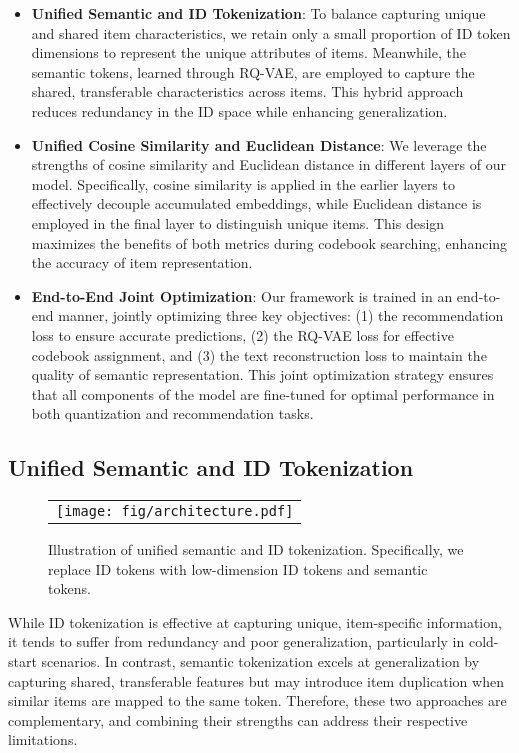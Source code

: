 \begin{itemize}[leftmargin=*]
    \item \textbf{Unified Semantic and ID Tokenization}: To balance capturing unique and shared item characteristics, we retain only a small proportion of ID token dimensions to represent the unique attributes of items. Meanwhile, the semantic tokens, learned through RQ-VAE, are employed to capture the shared, transferable characteristics across items. This hybrid approach reduces redundancy in the ID space while enhancing generalization.
    
    \item \textbf{Unified Cosine Similarity and Euclidean Distance}: We leverage the strengths of cosine similarity and Euclidean distance in different layers of our model. Specifically, cosine similarity is applied in the earlier layers to effectively decouple accumulated embeddings, while Euclidean distance is employed in the final layer to distinguish unique items. This design maximizes the benefits of both metrics during codebook searching, enhancing the accuracy of item representation.
    
    \item \textbf{End-to-End Joint Optimization}: Our framework is trained in an end-to-end manner, jointly optimizing three key objectives: (1) the recommendation loss to ensure accurate predictions, (2) the RQ-VAE loss for effective codebook assignment, and (3) the text reconstruction loss to maintain the quality of semantic representation. This joint optimization strategy ensures that all components of the model are fine-tuned for optimal performance in both quantization and recommendation tasks.
\end{itemize}


\subsection{Unified Semantic and ID Tokenization}
\begin{figure}[!htb]
		\centering
		\begin{tabular}{c}
		    	\texttt{[image: fig/architecture.pdf]}
		\end{tabular}
	\caption{Illustration of unified semantic and ID tokenization. Specifically, we replace ID tokens with low-dimension ID tokens and semantic tokens.}	\label{fig:token}
\end{figure}

While ID tokenization is effective at capturing unique, item-specific information, it tends to suffer from redundancy and poor generalization, particularly in cold-start scenarios. In contrast, semantic tokenization excels at generalization by capturing shared, transferable features but may introduce item duplication when similar items are mapped to the same token. Therefore, these two approaches are complementary, and combining their strengths can address their respective limitations.

